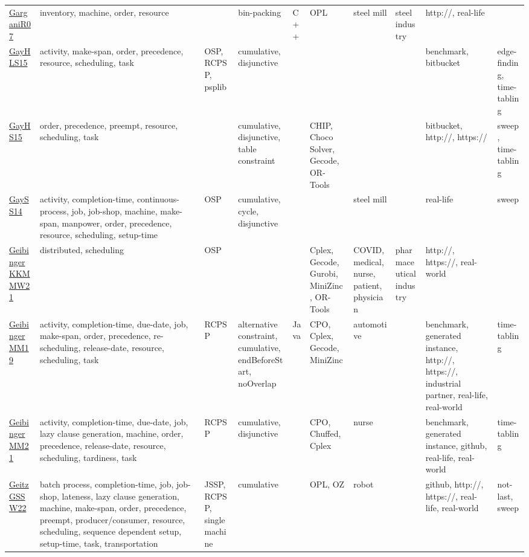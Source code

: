 {\begin{longtable}{p{3cm}p{4cm}p{2cm}p{2cm}p{2cm}p{2cm}p{2cm}p{2cm}p{2cm}p{2cm}}
\href{papers/GarganiR07.pdf}{GarganiR07}~\cite{GarganiR07} & inventory, machine, order, resource &  & bin-packing & C++ & OPL & steel mill & steel industry & http://, real-life & \\
\href{papers/GayHLS15.pdf}{GayHLS15}~\cite{GayHLS15} & activity, make-span, order, precedence, resource, scheduling, task & OSP, RCPSP, psplib & cumulative, disjunctive &  &  &  &  & benchmark, bitbucket & edge-finding, time-tabling\\
\href{papers/GayHS15.pdf}{GayHS15}~\cite{GayHS15} & order, precedence, preempt, resource, scheduling, task &  & cumulative, disjunctive, table constraint &  & CHIP, Choco Solver, Gecode, OR-Tools &  &  & bitbucket, http://, https:// & sweep, time-tabling\\
\href{papers/GaySS14.pdf}{GaySS14}~\cite{GaySS14} & activity, completion-time, continuous-process, job, job-shop, machine, make-span, manpower, order, precedence, resource, scheduling, setup-time & OSP & cumulative, cycle, disjunctive &  &  & steel mill &  & real-life & sweep\\
\href{papers/GeibingerKKMMW21.pdf}{GeibingerKKMMW21}~\cite{GeibingerKKMMW21} & distributed, scheduling & OSP &  &  & Cplex, Gecode, Gurobi, MiniZinc, OR-Tools & COVID, medical, nurse, patient, physician & pharmaceutical industry & http://, https://, real-world & \\
\href{papers/GeibingerMM19.pdf}{GeibingerMM19}~\cite{GeibingerMM19} & activity, completion-time, due-date, job, make-span, order, precedence, re-scheduling, release-date, resource, scheduling, task & RCPSP & alternative constraint, cumulative, endBeforeStart, noOverlap & Java & CPO, Cplex, Gecode, MiniZinc & automotive &  & benchmark, generated instance, http://, https://, industrial partner, real-life, real-world & time-tabling\\
\href{papers/GeibingerMM21.pdf}{GeibingerMM21}~\cite{GeibingerMM21} & activity, completion-time, due-date, job, lazy clause generation, machine, order, precedence, release-date, resource, scheduling, tardiness, task & RCPSP & cumulative, disjunctive &  & CPO, Chuffed, Cplex & nurse &  & benchmark, generated instance, github, real-life, real-world & time-tabling\\
\href{papers/GeitzGSSW22.pdf}{GeitzGSSW22}~\cite{GeitzGSSW22} & batch process, completion-time, job, job-shop, lateness, lazy clause generation, machine, make-span, order, precedence, preempt, producer/consumer, resource, scheduling, sequence dependent setup, setup-time, task, transportation & JSSP, RCPSP, single machine & cumulative &  & OPL, OZ & robot &  & github, http://, https://, real-life, real-world & not-last, sweep\\

\end{longtable}}
